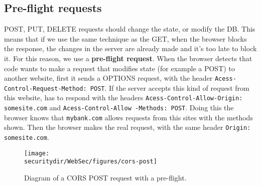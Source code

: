 \subsection{Pre-flight requests}
POST, PUT, DELETE requests should change the state, or modify the DB. This means that if we use the same technique as the GET, when the browser blocks the response, the changes in the server are already made and it's too late to block it. For this reason, we use a \textbf{pre-flight request}. When the browser detects that code wants to make a request that modifies state (for example a POST) to another website, first it sends a OPTIONS request, with the header \texttt{Acess-Control-Request-Method: POST}. If the server accepts this kind of request from this website, has to respond with the headers \verb|Acess-Control-Allow-Origin: somesite.com| and  \texttt{Acess-Control-Allow
-Methods: POST}. Doing this the browser knows that \verb|mybank.com| allows requests from this sites with the methods shown. Then the browser makes the real request, with the same header \verb|Origin: somesite.com|. 


\begin{figure}[htb]
	\begin{centering}
		\texttt{[image: \\securitydir/WebSec/figures/cors-post]}
		\par\end{centering}
	\caption{\label{fig:ecb} Diagram of a CORS POST request with a pre-flight.}
\end{figure}